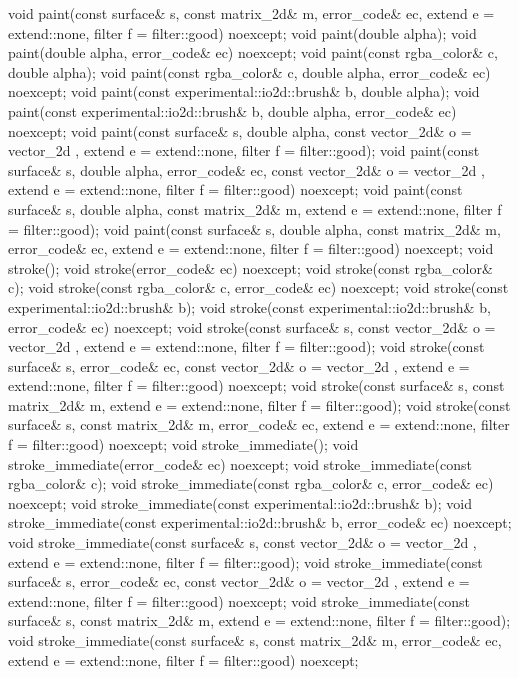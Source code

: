\begin{codeblock}
{{{{{    void paint(const surface& s, const matrix_2d& m, error_code& ec,
      extend e = extend::none, filter f = filter::good) noexcept;
    void paint(double alpha);
    void paint(double alpha, error_code& ec) noexcept;
    void paint(const rgba_color& c, double alpha);
    void paint(const rgba_color& c, double alpha, error_code& ec) noexcept;
    void paint(const experimental::io2d::brush& b, double alpha);
    void paint(const experimental::io2d::brush& b, double alpha,
      error_code& ec) noexcept;
    void paint(const surface& s, double alpha,
      const vector_2d& o = vector_2d{ }, extend e = extend::none,
      filter f = filter::good);
    void paint(const surface& s, double alpha, error_code& ec,
      const vector_2d& o = vector_2d{ }, extend e = extend::none,
      filter f = filter::good) noexcept;
    void paint(const surface& s, double alpha, const matrix_2d& m,
      extend e = extend::none, filter f = filter::good);
    void paint(const surface& s, double alpha, const matrix_2d& m,
      error_code& ec, extend e = extend::none, filter f = filter::good)
      noexcept;
    void stroke();
    void stroke(error_code& ec) noexcept;
    void stroke(const rgba_color& c);
    void stroke(const rgba_color& c, error_code& ec) noexcept;
    void stroke(const experimental::io2d::brush& b);
    void stroke(const experimental::io2d::brush& b, error_code& ec) noexcept;
    void stroke(const surface& s, const vector_2d& o = vector_2d{ },
      extend e = extend::none, filter f = filter::good);
    void stroke(const surface& s, error_code& ec,
      const vector_2d& o = vector_2d{ },
      extend e = extend::none, filter f = filter::good) noexcept;
    void stroke(const surface& s, const matrix_2d& m, extend e = extend::none,
      filter f = filter::good);
    void stroke(const surface& s, const matrix_2d& m, error_code& ec,
      extend e = extend::none, filter f = filter::good) noexcept;
    void stroke_immediate();
    void stroke_immediate(error_code& ec) noexcept;
    void stroke_immediate(const rgba_color& c);
    void stroke_immediate(const rgba_color& c, error_code& ec) noexcept;
    void stroke_immediate(const experimental::io2d::brush& b);
    void stroke_immediate(const experimental::io2d::brush& b, error_code& ec)
      noexcept;
    void stroke_immediate(const surface& s, const vector_2d& o = vector_2d{ },
      extend e = extend::none, filter f = filter::good);
    void stroke_immediate(const surface& s, error_code& ec,
      const vector_2d& o = vector_2d{ }, extend e = extend::none,
      filter f = filter::good) noexcept;
    void stroke_immediate(const surface& s, const matrix_2d& m,
      extend e = extend::none, filter f = filter::good);
    void stroke_immediate(const surface& s, const matrix_2d& m, error_code& ec,
      extend e = extend::none, filter f = filter::good) noexcept;
    
}}}}}
\end{codeblock}
